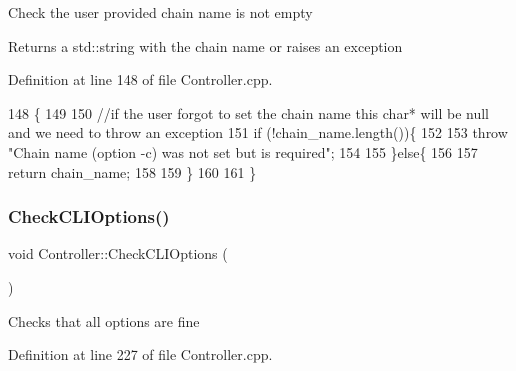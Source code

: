 Check the user provided chain name is not empty \begin{DoxyReturn}{Returns}
a std\+::string with the chain name or raises an exception 
\end{DoxyReturn}


Definition at line 148 of file Controller.\+cpp.


\begin{DoxyCode}
148                                      \{
149   
150   \textcolor{comment}{//if the user forgot to set the chain name this char* will be null and we need to throw an exception}
151   \textcolor{keywordflow}{if} (!chain\_name.length())\{
152     
153     \textcolor{keywordflow}{throw} \textcolor{stringliteral}{"Chain name (option -c) was not set but is required"};
154     
155   \}\textcolor{keywordflow}{else}\{
156   
157     \textcolor{keywordflow}{return} chain\_name;
158     
159   \}
160   
161 \}
\end{DoxyCode}
\mbox{\label{classController_a1307438a1590b0deff238e4ee46aaed3}} 
\subsubsection{\texorpdfstring{Check\+C\+L\+I\+Options()}{CheckCLIOptions()}}
{\footnotesize\ttfamily void Controller\+::\+Check\+C\+L\+I\+Options (\begin{DoxyParamCaption}{ }\end{DoxyParamCaption})}

Checks that all options are fine 

Definition at line 227 of file Controller.\+cpp.


